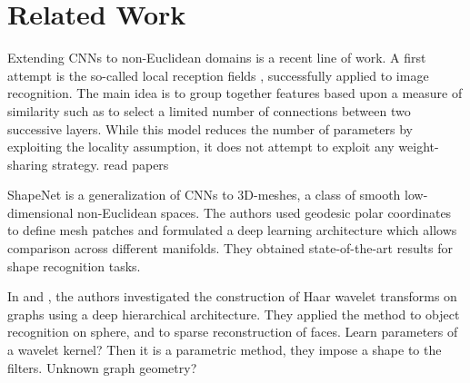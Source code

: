 \documentclass{article}
\newcommand{\todo}[1]{{\color{red} #1 }}
\begin{document}
\section{Related Work}


Extending CNNs to non-Euclidean domains is a recent line of work. A first
attempt is the so-called local reception fields \cite{pro:GregorLeCun10LRF,
pro:CoatesNg11LRF}, successfully applied to image recognition. The main idea is
to group together features based upon a measure of similarity such as to select
a limited number of connections between two successive layers. While this model
reduces the number of parameters by exploiting the locality assumption, it does
not attempt to exploit any weight-sharing strategy.
\todo{read papers}

ShapeNet \cite{pro:MasciBoscainiBronsteinVandergheynst15GeoDL,
art:MasciBoscainiBronsteinVandergheynst15ShapeNet} is a generalization of CNNs
to 3D-meshes, a class of smooth low-dimensional non-Euclidean spaces. The
authors used geodesic polar coordinates to define mesh patches and formulated a
deep learning architecture which allows comparison across different manifolds.
They obtained state-of-the-art results for shape recognition tasks.

In \cite{pro:ChenChengMallat14deepHaar} and \cite{pro:RustamovGuibas14deepHaar},
the authors investigated the construction of Haar wavelet transforms on graphs
using a deep hierarchical architecture. They applied the method to object
recognition on sphere, and to sparse reconstruction of faces.
\todo{Learn parameters of a wavelet kernel? Then it is a parametric method,
they impose a shape to the filters.}
\todo{Unknown graph geometry?}
\end{document}
